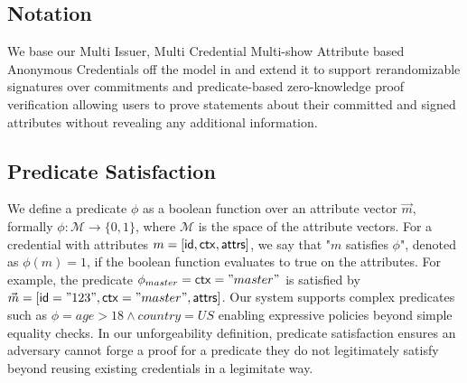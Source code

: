 \subsection{Notation}
We base our Multi Issuer, Multi Credential Multi-show Attribute based Anonymous Credentials off the model in \cite{fuchsbauer_structure-preserving_2019} and extend it to support rerandomizable signatures over commitments and predicate-based zero-knowledge proof verification allowing users to prove statements about their committed and signed attributes without revealing any additional information.

\subsection{Predicate Satisfaction}
We define a predicate $\phi$ as a boolean function over an attribute vector $\vec{m}$, formally  $\phi: \mathcal{M} \rightarrow \{0,1\}$, where $\mathcal{M}$ is the space of the attribute vectors. 
For a credential with attributes $m = [\mathsf{id}, \mathsf{ctx}, \mathsf{attrs}]$, we say that "$m$ satisfies $\phi$", denoted as $\phi(m) = 1$, if the boolean function evaluates to true on the attributes.
For example, the predicate $\phi_{master} = \mathsf{ctx} = "master"$ is satisfied by $\vec{m} = [\mathsf{id}="123", \mathsf{ctx}="master", \mathsf{attrs}]$. Our system supports complex predicates such as $\phi = age > 18 \wedge country = US$ enabling expressive policies beyond simple equality checks. In our unforgeability definition, predicate satisfaction ensures an adversary cannot forge a proof for a predicate they do not legitimately satisfy beyond reusing existing credentials in a legimitate way.

